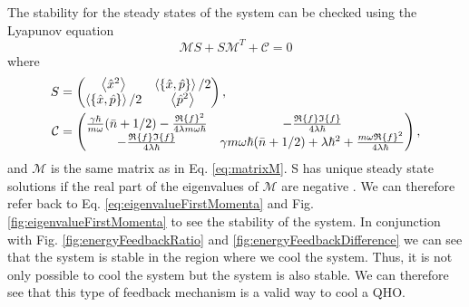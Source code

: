The stability for the steady states of the system can be checked using the Lyapunov equation
\begin{equation}
    \mathcal{M} S + S \mathcal{M}^T  + \mathcal{C} = 0
\end{equation}
where 
\begin{align}
    S &= 
    \begin{pmatrix}
    \expval{\xop^2} & \expval{\acomm{\xop}{\pop}}/2\\
    \expval{\acomm{\xop}{\pop}}/2 & \expval{\pop^2}    
    \end{pmatrix},
    \\
    \mathcal{C} &=
    \begin{pmatrix}
        \frac{\gamma \hbar}{m \omega} (\nbar + 1/2) - \frac{\re{f}^2}{4\lambda m \omega \hbar} & -\frac{\re{f} \im{f}}{4 \lambda \hbar}\\
        -\frac{\re{f} \im{f}}{4 \lambda \hbar} & \gamma m \omega \hbar (\nbar + 1/2) + \lambda \hbar^2 +\frac{m \omega \re{f}^2}{4 \lambda \hbar}
    \end{pmatrix},
\end{align}
and $\mathcal{M}$ is the same matrix as in Eq. \eqref{eq:matrixM}. S has unique steady state solutions if the real part of the eigenvalues of $\mathcal{M}$ are negative \cite{Purkayastha:2022}. We can therefore refer back to Eq. \eqref{eq:eigenvalueFirstMomenta} and Fig. \ref{fig:eigenvalueFirstMomenta} to see the stability of the system. In conjunction with Fig. \ref{fig:energyFeedbackRatio} and \ref{fig:energyFeedbackDifference} we can see that the system is stable in the region where we cool the system. Thus, it is not only possible to cool the system but the system is also stable. We can therefore see that this type of feedback mechanism is a valid way to cool a QHO.